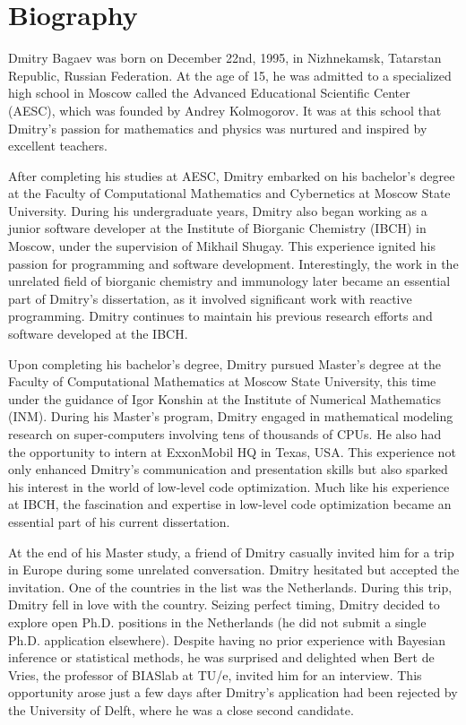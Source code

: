 \chapter{Biography}

Dmitry Bagaev was born on December 22nd, 1995, in Nizhnekamsk, Tatarstan Republic, Russian
Federation.
At the age of 15, he was admitted to a specialized high school in Moscow called the Advanced
Educational Scientific Center (AESC), which was founded by Andrey Kolmogorov.
It was at this school that Dmitry's passion for mathematics and physics was nurtured and
inspired by excellent teachers.

After completing his studies at AESC, Dmitry embarked on his bachelor's degree at the Faculty
of Computational Mathematics and Cybernetics at Moscow State University.
During his undergraduate years, Dmitry also began working as a junior software developer at
the Institute of Biorganic Chemistry (IBCH) in Moscow, under the supervision of Mikhail
Shugay.
This experience ignited his passion for programming and software development.
Interestingly, the work in the unrelated field of biorganic chemistry and immunology later
became an essential part of Dmitry's dissertation, as it involved significant work with
reactive programming.
Dmitry continues to maintain his previous research efforts and software developed at the IBCH.

Upon completing his bachelor's degree, Dmitry pursued Master's degree at the Faculty of
Computational Mathematics at Moscow State University, this time under the guidance of Igor
Konshin at the Institute of Numerical Mathematics (INM).
During his Master's program, Dmitry engaged in mathematical modeling research on
super-computers involving tens of thousands of CPUs.
He also had the opportunity to intern at ExxonMobil HQ in Texas, USA.
This experience not only enhanced Dmitry's communication and presentation skills but also
sparked his interest in the world of low-level code optimization.
Much like his experience at IBCH, the fascination and expertise in low-level code optimization
became an essential part of his current dissertation.

At the end of his Master study, a friend of Dmitry casually invited him for a trip in Europe
during some unrelated conversation.
Dmitry hesitated but accepted the invitation.
One of the countries in the list was the Netherlands.
During this trip, Dmitry fell in love with the country.
Seizing perfect timing, Dmitry decided to explore open Ph.D.
positions in the Netherlands (he did not submit a single Ph.D. application elsewhere).
Despite having no prior experience with Bayesian inference or statistical methods, he was
surprised and delighted when Bert de Vries, the professor of BIASlab at TU/e, invited him for
an interview.
This opportunity arose just a few days after Dmitry's application had been rejected by the
University of Delft, where he was a close second candidate.

